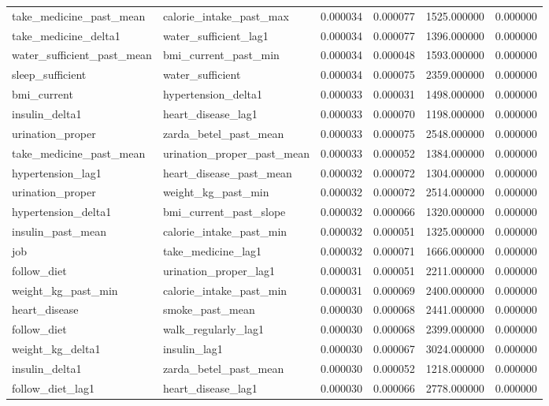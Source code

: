 \begin{longtable}{llrrrr}
take\_medicine\_past\_mean & calorie\_intake\_past\_max & 0.000034 & 0.000077 & 1525.000000 & 0.000000 \\
take\_medicine\_delta1 & water\_sufficient\_lag1 & 0.000034 & 0.000077 & 1396.000000 & 0.000000 \\
water\_sufficient\_past\_mean & bmi\_current\_past\_min & 0.000034 & 0.000048 & 1593.000000 & 0.000000 \\
sleep\_sufficient & water\_sufficient & 0.000034 & 0.000075 & 2359.000000 & 0.000000 \\
bmi\_current & hypertension\_delta1 & 0.000033 & 0.000031 & 1498.000000 & 0.000000 \\
insulin\_delta1 & heart\_disease\_lag1 & 0.000033 & 0.000070 & 1198.000000 & 0.000000 \\
urination\_proper & zarda\_betel\_past\_mean & 0.000033 & 0.000075 & 2548.000000 & 0.000000 \\
take\_medicine\_past\_mean & urination\_proper\_past\_mean & 0.000033 & 0.000052 & 1384.000000 & 0.000000 \\
hypertension\_lag1 & heart\_disease\_past\_mean & 0.000032 & 0.000072 & 1304.000000 & 0.000000 \\
urination\_proper & weight\_kg\_past\_min & 0.000032 & 0.000072 & 2514.000000 & 0.000000 \\
hypertension\_delta1 & bmi\_current\_past\_slope & 0.000032 & 0.000066 & 1320.000000 & 0.000000 \\
insulin\_past\_mean & calorie\_intake\_past\_min & 0.000032 & 0.000051 & 1325.000000 & 0.000000 \\
job & take\_medicine\_lag1 & 0.000032 & 0.000071 & 1666.000000 & 0.000000 \\
follow\_diet & urination\_proper\_lag1 & 0.000031 & 0.000051 & 2211.000000 & 0.000000 \\
weight\_kg\_past\_min & calorie\_intake\_past\_min & 0.000031 & 0.000069 & 2400.000000 & 0.000000 \\
heart\_disease & smoke\_past\_mean & 0.000030 & 0.000068 & 2441.000000 & 0.000000 \\
follow\_diet & walk\_regularly\_lag1 & 0.000030 & 0.000068 & 2399.000000 & 0.000000 \\
weight\_kg\_delta1 & insulin\_lag1 & 0.000030 & 0.000067 & 3024.000000 & 0.000000 \\
insulin\_delta1 & zarda\_betel\_past\_mean & 0.000030 & 0.000052 & 1218.000000 & 0.000000 \\
follow\_diet\_lag1 & heart\_disease\_lag1 & 0.000030 & 0.000066 & 2778.000000 & 0.000000 \\

\end{longtable}
